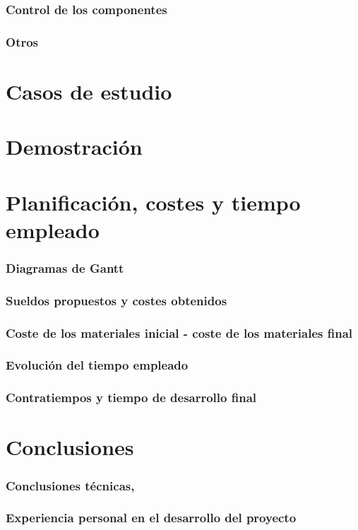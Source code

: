 \subsubsection{ Control de los componentes}
\subsubsection{Otros}
\section{Casos de estudio} %
\section{Demostración}
\section{Planificación, costes y tiempo empleado}
\subsubsection{Diagramas de Gantt}
\subsubsection{Sueldos propuestos y costes obtenidos}
\subsubsection{Coste de los materiales inicial - coste de los materiales final}
\subsubsection{Evolución del tiempo empleado}
\subsubsection{Contratiempos y tiempo de desarrollo final}
\section{Conclusiones}
\subsubsection{Conclusiones técnicas,}
\subsubsection{Experiencia personal en el desarrollo del proyecto}
